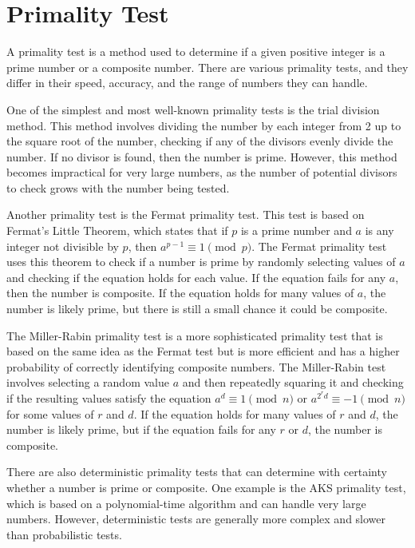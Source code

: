 \documentclass[12pt,openany]{book}
\theoremstyle{definition}
\begin{document}
	\section{Primality Test}
	
	A primality test is a method used to determine if a given positive integer is a prime number or a composite number. There are various primality tests, and they differ in their speed, accuracy, and the range of numbers they can handle.
	
	One of the simplest and most well-known primality tests is the trial division method. This method involves dividing the number by each integer from 2 up to the square root of the number, checking if any of the divisors evenly divide the number. If no divisor is found, then the number is prime. However, this method becomes impractical for very large numbers, as the number of potential divisors to check grows with the number being tested.
	
	Another primality test is the Fermat primality test. This test is based on Fermat's Little Theorem, which states that if $p$ is a prime number and $a$ is any integer not divisible by $p$, then $a^{p-1} \equiv 1 \pmod p$. The Fermat primality test uses this theorem to check if a number is prime by randomly selecting values of $a$ and checking if the equation holds for each value. If the equation fails for any $a$, then the number is composite. If the equation holds for many values of $a$, the number is likely prime, but there is still a small chance it could be composite.
	
	The Miller-Rabin primality test is a more sophisticated primality test that is based on the same idea as the Fermat test but is more efficient and has a higher probability of correctly identifying composite numbers. The Miller-Rabin test involves selecting a random value $a$ and then repeatedly squaring it and checking if the resulting values satisfy the equation $a^{d} \equiv 1 \pmod n$ or $a^{2^rd} \equiv -1 \pmod n$ for some values of $r$ and $d$. If the equation holds for many values of $r$ and $d$, the number is likely prime, but if the equation fails for any $r$ or $d$, the number is composite.
	
	There are also deterministic primality tests that can determine with certainty whether a number is prime or composite. One example is the AKS primality test, which is based on a polynomial-time algorithm and can handle very large numbers. However, deterministic tests are generally more complex and slower than probabilistic tests.
	
\end{document}
